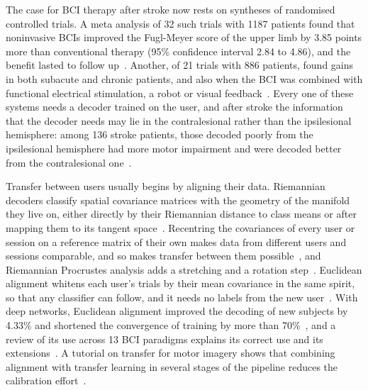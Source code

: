 \documentclass[pdflatex,sn-mathphys-num]{sn-jnl}
\begin{document}
The case for BCI therapy after stroke now rests on syntheses of randomised controlled trials. A meta analysis of 32 such trials with 1187 patients found that noninvasive BCIs improved the Fugl-Meyer score of the upper limb by 3.85 points more than conventional therapy (95\% confidence interval 2.84 to 4.86), and the benefit lasted to follow up~\cite{mortezaei2026}. Another, of 21 trials with 886 patients, found gains in both subacute and chronic patients, and also when the BCI was combined with functional electrical stimulation, a robot or visual feedback~\cite{li2025bci}. Every one of these systems needs a decoder trained on the user, and after stroke the information that the decoder needs may lie in the contralesional rather than the ipsilesional hemisphere: among 136 stroke patients, those decoded poorly from the ipsilesional hemisphere had more motor impairment and were decoded better from the contralesional one~\cite{mansour2022}.

Transfer between users usually begins by aligning their data. Riemannian decoders classify spatial covariance matrices with the geometry of the manifold they live on, either directly by their Riemannian distance to class means or after mapping them to its tangent space~\cite{barachant2012}. Recentring the covariances of every user or session on a reference matrix of their own makes data from different users and sessions comparable, and so makes transfer between them possible~\cite{zanini2018}, and Riemannian Procrustes analysis adds a stretching and a rotation step~\cite{rodrigues2019}. Euclidean alignment whitens each user's trials by their mean covariance in the same spirit, so that any classifier can follow, and it needs no labels from the new user~\cite{he2020}. With deep networks, Euclidean alignment improved the decoding of new subjects by 4.33\% and shortened the convergence of training by more than 70\%~\cite{junqueira2024}, and a review of its use across 13 BCI paradigms explains its correct use and its extensions~\cite{wu2025ea}. A tutorial on transfer for motor imagery shows that combining alignment with transfer learning in several stages of the pipeline reduces the calibration effort~\cite{wu2022tutorial}.
\end{document}
